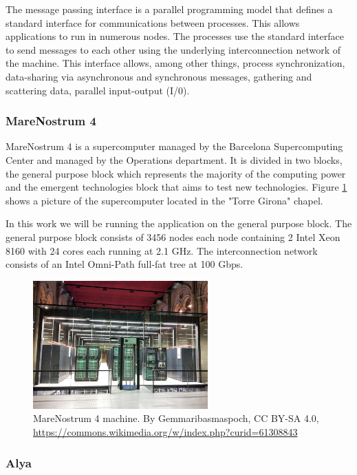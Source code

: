 \justify
The message passing interface \cite{mpi} is a parallel programming model that defines a standard  interface for communications between processes. This allows applications to run in numerous nodes. The processes use the standard interface to send messages to each other using the underlying interconnection network of the machine. This interface allows, among other things, process synchronization, data-sharing via asynchronous and synchronous messages, gathering and scattering data, parallel input-output (I/0).

\subsubsection{MareNostrum 4}

\justify
MareNostrum 4 \cite{mn4} is a supercomputer managed by the Barcelona Supercomputing Center and managed by the Operations department. It is divided in two blocks, the general purpose block which represents the majority of the computing power and the emergent technologies block that aims to test new technologies. Figure \ref{fig:mn4} shows a picture of the supercomputer located in the "Torre Girona" chapel.

\justify
In this work we will be running the application on the general purpose block.
The general purpose block consists of 3456 nodes each node containing 2 Intel Xeon 8160 with 24 cores each running at 2.1 GHz. The interconnection network consists of an Intel Omni-Path full-fat tree at 100 Gbps.

\begin{figure}[htbp]
  \centering
  \includegraphics[width=0.6\textwidth]{mn4}
  \caption[MareNostrum4 machine]{MareNostrum 4 machine. {By Gemmaribasmaspoch, CC BY-SA 4.0, \url{https://commons.wikimedia.org/w/index.php?curid=61308843}}}
  \label{fig:mn4}
\end{figure}

\subsubsection{Alya}

